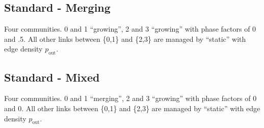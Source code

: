 \documentclass{article}
\def\pout{p_\mathrm{out}}
\begin{document}
\subsection{Standard - Merging}
Four communities.  0 and 1 ``growing'', 2 and 3 ``growing'' with phase
factors of 0 and .5.  All other links between \{0,1\} and \{2,3\} are
managed by ``static'' with edge density $\pout$.

\subsection{Standard - Mixed}
Four communities.  0 and 1 ``merging'', 2 and 3 ``growing'' with phase
factors of 0 and 0.  All other links between \{0,1\} and \{2,3\} are
managed by ``static'' with edge density $\pout$.
\end{document}
